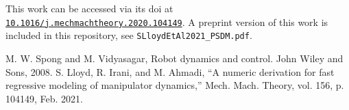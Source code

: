 \documentclass[12pt]{article}
\begin{document}
This work can be accessed via its doi at \href{https://doi.org/10.1016/j.mechmachtheory.2020.104149}{\texttt{10.1016/j.mechmachtheory.2020.104149}}. A preprint version of this work is included in this repository, see \texttt{SLloydEtAl2021\_PSDM.pdf}.



\begin{thebibliography}{2}
	 M. W. Spong and M. Vidyasagar, Robot dynamics and control. John Wiley and Sons, 2008.
	 S. Lloyd, R. Irani, and M. Ahmadi, ``A numeric derivation for fast regressive modeling of manipulator dynamics,'' Mech. Mach. Theory, vol. 156, p. 104149, Feb. 2021.
\end{thebibliography}
\end{document}
